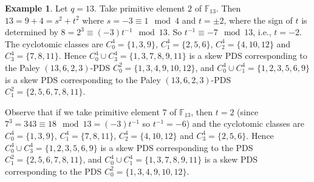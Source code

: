 \documentclass[12pt, a4paper]{article}
\theoremstyle{definition}
\newtheorem{example}[theorem]{Example}
\begin{document}
\begin{example}\label{ex:e4example}
Let $q=13$. Take primitive element $2$ of $\mathbb{F}_{13}$.  Then $13=9+4=s^2+t^2$ where $s=-3 \equiv 1 \mod 4$ and $t=\pm 2$, where the sign of $t$ is determined by $8=2^3 \equiv (-3)t^{-1} \mod 13$.   So $t^{-1} \equiv -7 \mod 13$, i.e., $t=-2$.  The cyclotomic classes are $C_0^4=\{1,3,9\}$, $C_1^4=\{2,5,6\}$, $C_2^4=\{4,10,12\}$ and $C_3^4=\{7,8,11\}$.  Hence $C_0^4 \cup C_3^4=\{1,3,7,8,9,11\}$ is a skew PDS corresponding to the Paley $(13,6,2,3)$-PDS $C_0^2=\{1,3,4,9,10,12\}$, and $C_0^4 \cup C_1^4=\{1,2,3,5,6,9\}$ is a skew PDS corresponding to the Paley $(13,6,2,3)$-PDS $C_1^2=\{2,5,6,7,8,11\}$.

Observe that if we take primitive element $7$ of $\mathbb{F}_{13}$, then $t=2$ (since $7^3=343 \equiv 18 \mod 13=(-3)t^{-1}$ so $t^{-1}=-6$)  and the cyclotomic classes are $C_0^4=\{1,3,9\}$, $C_1^4=\{7,8,11\}$, $C_2^4=\{4,10,12\}$ and $C_3^4=\{2,5,6\}$.  Hence $C_0^4 \cup C_3^4=\{1,2,3,5,6,9\}$ is a skew PDS corresponding to the PDS $C_1^2=\{2,5,6,7,8,11\}$, and $C_0^4 \cup C_1^4=\{1,3,7,8,9,11\}$ is a skew PDS corresponding to the PDS $C_0^2=\{1,3,4,9,10,12\}$.
\end{example}
\end{document}
